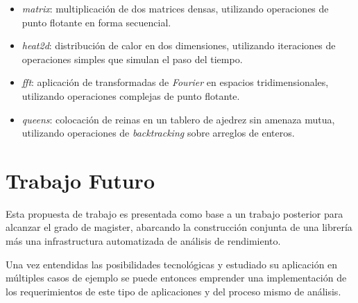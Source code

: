 \documentclass[a4paper]{article}
\begin{document}
\begin{itemize}

\item \emph{matrix}: multiplicaci\'on de dos matrices densas, utilizando
  operaciones de punto flotante en forma secuencial.

\item \emph{heat2d}: distribuci\'on de calor en dos dimensiones, utilizando
  iteraciones de operaciones simples que simulan el paso del tiempo.

\item \emph{fft}: aplicaci\'on de transformadas de {\it Fourier} en espacios
  tridimensionales, utilizando operaciones complejas de punto flotante.

\item \emph{queens}: colocaci\'on de reinas en un tablero de ajedrez sin
  amenaza mutua, utilizando operaciones de {\it backtracking} sobre arreglos
  de enteros.

\end{itemize}

\section{Trabajo Futuro}

Esta propuesta de trabajo es presentada como base a un trabajo posterior para
alcanzar el grado de magister, abarcando la construcci\'on conjunta de una
librer\'ia m\'as una infrastructura automatizada de an\'alisis de rendimiento.

\smallskip

Una vez entendidas las posibilidades tecnol\'ogicas y estudiado su
aplicaci\'on en m\'ultiples casos de ejemplo se puede entonces emprender una
implementaci\'on de los requerimientos de este tipo de aplicaciones y del
proceso mismo de an\'alisis.
\end{document}

